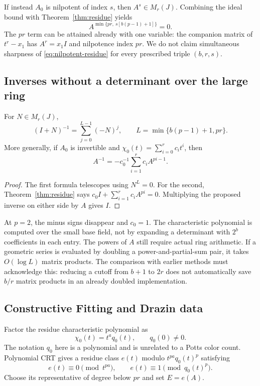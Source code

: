 If instead $A_0$ is nilpotent of index $s$, then $A^s\in M_r(J)$.
Combining the ideal bound with Theorem~\ref{thm:residue} yields
\begin{equation}
 A^{\min\{pr,\ s[b(p-1)+1]\}}=0.
 \label{eq:nilpotent-residue}
\end{equation}
The $pr$ term can be attained already with one variable: the companion
matrix of $t^r-x_1$ has $A^r=x_1I$ and nilpotence index $pr$.
We do not claim simultaneous sharpness of \eqref{eq:nilpotent-residue}
for every prescribed triple $(b,r,s)$.

\subsection{Inverses without a determinant over the large ring}

\begin{corollary}\label{cor:inverse}
For $N\in M_r(J)$,
\[
 (I+N)^{-1}=\sum_{j=0}^{L-1}(-N)^j,\qquad
 L=\min\{b(p-1)+1,pr\}.
\]
More generally, if $A_0$ is invertible and
$\chi_0(t)=\sum_{i=0}^r c_it^i$, then
\[
 A^{-1}=-c_0^{-1}\sum_{i=1}^r c_iA^{pi-1}.
\]
\end{corollary}
\begin{proof}
The first formula telescopes using $N^L=0$.
For the second, Theorem~\ref{thm:residue} says
$c_0I+\sum_{i=1}^r c_iA^{pi}=0$.
Multiplying the proposed inverse on either side by $A$ gives $I$.
\end{proof}

At $p=2$, the minus signs disappear and $c_0=1$.
The characteristic polynomial is computed over the small base field, not
by expanding a determinant with $2^b$ coefficients in each entry.
The powers of $A$ still require actual ring arithmetic.
If a geometric series is evaluated by doubling a power-and-partial-sum
pair, it takes $O(\log L)$ matrix products. The comparison with earlier
methods must acknowledge this: reducing a cutoff from $b+1$ to $2r$
does not automatically save $b/r$ matrix products in an already doubled
implementation.

\subsection{Constructive Fitting and Drazin data}

Factor the residue characteristic polynomial as
\[
 \chi_0(t)=t^a q_0(t),\qquad q_0(0)\ne0.
\]
The notation $q_0$ here is a polynomial and is unrelated to a Potts color
count. Polynomial CRT gives a residue class $e(t)$ modulo
$t^{pa}q_0(t)^p$ satisfying
\[
 e(t)\equiv0\pmod{t^{pa}},\qquad
 e(t)\equiv1\pmod{q_0(t)^p}.
\]
Choose its representative of degree below $pr$ and set $E=e(A)$.

